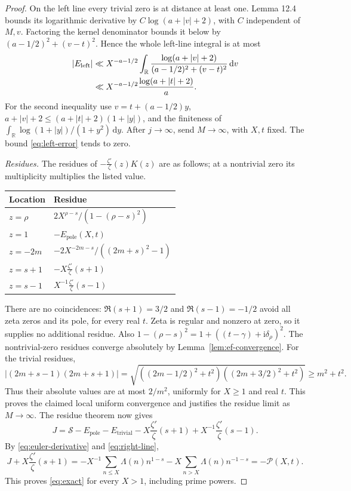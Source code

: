 \documentclass[11pt]{article}
\newcommand{\dd}{\,\mathrm d}
\newcommand{\ii}{\mathrm i}
\newcommand{\ZL}{\frac{\zeta'}{\zeta}}
\newcommand{\ZS}{\mathcal S}
\newcommand{\PS}{\mathcal P}
\newcommand{\EP}{E_{\mathrm{pole}}}
\newcommand{\ET}{E_{\mathrm{trivial}}}
\begin{document}
\begin{proof}
On the left line every trivial zero is at distance at least one.
Lemma 12.4 bounds its logarithmic derivative by
\(C\log(a+|v|+2)\), with \(C\) independent of \(M,v\).
Factoring the kernel denominator bounds it below by
\((a-1/2)^2+(v-t)^2\). Hence the whole left-line integral is at most
\begin{align}
 |E_{\mathrm{left}}|
 &\ll X^{-a-1/2}
 \int_{\mathbb R}\frac{\log(a+|v|+2)}{(a-1/2)^2+(v-t)^2}\dd v
 \notag\\
 &\ll X^{-a-1/2}\frac{\log(a+|t|+2)}{a}.
 \label{eq:left-error}
\end{align}
For the second inequality use \(v=t+(a-1/2)y\),
\(a+|v|+2\leq(a+|t|+2)(1+|y|)\), and the finiteness of
\(\int_{\mathbb R}\log(1+|y|)/(1+y^2)\dd y\).
After \(j\to\infty\), send \(M\to\infty\), with \(X,t\) fixed.
The bound \eqref{eq:left-error} tends to zero.

\textit{Residues.}
The residues of \(-\ZL(z)K(z)\) are as follows; at a nontrivial
zero its multiplicity multiplies the listed value.
\begin{center}
\begin{tabular}{ll}
\toprule
Location & Residue \\
\midrule
\(z=\rho\) & \(2X^{\rho-s}/(1-(\rho-s)^2)\) \\
\(z=1\) & \(-\EP(X,t)\) \\
\(z=-2m\) & \(-2X^{-2m-s}/((2m+s)^2-1)\) \\
\(z=s+1\) & \(-X\ZL(s+1)\) \\
\(z=s-1\) & \(X^{-1}\ZL(s-1)\) \\
\bottomrule
\end{tabular}
\end{center}
There are no coincidences: \(\Re(s+1)=3/2\) and
\(\Re(s-1)=-1/2\) avoid all zeta zeros and its pole, for every
real \(t\). Zeta is regular and nonzero at zero, so it supplies no
additional residue. Also
\(1-(\rho-s)^2=1+((t-\gamma)+\ii\delta_\rho)^2\).
The nontrivial-zero residues converge absolutely by
Lemma~\ref{lem:ef-convergence}. For the trivial residues,
\begin{equation}\label{eq:trivial-majorant}
 |(2m+s-1)(2m+s+1)|
 =\sqrt{((2m-1/2)^2+t^2)((2m+3/2)^2+t^2)}
 \geq m^2+t^2.
\end{equation}
Thus their absolute values are at most \(2/m^2\), uniformly for
\(X\geq1\) and real \(t\). This proves the claimed local uniform
convergence and justifies the residue limit as \(M\to\infty\).
The residue theorem now gives
\[
 J=\ZS-\EP-\ET-X\ZL(s+1)+X^{-1}\ZL(s-1).
\]
By \eqref{eq:euler-derivative} and \eqref{eq:right-line},
\[
 J+X\ZL(s+1)
 =-X^{-1}\sum_{n\leq X}\Lambda(n)n^{1-s}
   -X\sum_{n>X}\Lambda(n)n^{-1-s}=-\PS(X,t).
\]
This proves \eqref{eq:exact} for every \(X>1\), including prime powers.


\end{proof}
\end{document}
